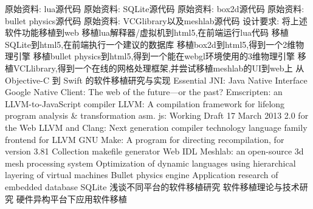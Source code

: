 \assignReq
{原始资料: lua源代码}
{原始资料: SQLite源代码}
{原始资料: box2d源代码}
{原始资料: bullet physics源代码}
{原始资料: VCGlibrary以及meshlab源代码}
{设计要求: 将上述软件功能移植到web}
\assignWork
{移植lua解释器/虚拟机到html5,在前端运行lua代码}
{移植SQLite到html5,在前端执行一个建议的数据库}
{移植box2d到html5,得到一个2维物理引擎}
{移植bullet physics到html5,得到一个能在webgl环境使用的3维物理引擎}
{移植VCLlibrary,得到一个在线的网格处理框架,并尝试移植meshlab的UI到web上}
\assignRef
{从 Objective-C 到 Swift 的软件移植研究与实现}
{Essential JNI: Java Native Interface}
{Google Native Client: The web of the future—or the past?}
{Emscripten: an LLVM-to-JavaScript compiler}
{LLVM: A compilation framework for lifelong program analysis \& transformation}
{asm. js: Working Draft 17 March 2013}
{2.0 for the Web}
{LLVM and Clang: Next generation compiler technology}
{language family frontend for LLVM}
\assignRefTwo
{GNU Make: A program for directing recompilation, for version 3.81}
{Collection makefile generator}
{Web IDL}
{Meshlab: an open-source 3d mesh processing system}
{Optimization of dynamic languages using hierarchical layering of virtual machines}
\assignRefThree
{Bullet physics engine}
{Application research of embedded database SQLite}
{浅谈不同平台的软件移植研究}
{软件移植理论与技术研究}
{硬件异构平台下应用软件移植}
